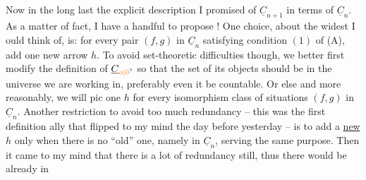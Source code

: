  Now in the long last the explicit description I promised of $\underline{C}_{n+1}$ in terms of $\underline{C}_n$. As a matter of fact, I have a handful to propose ! One choice, about the widest I ould think of, is: for every pair $(f,g)$ in $\underline{C}_n$ satisfying condition $(1)$ of (A), add one  new arrow $h$. To avoid set-theoretic difficulties though, we better  first modify the definition of $\underline{C}_{\unsure{o|0}}$ so that the set of its objects should be in the universe we are working in, preferably even it be countable. Or else and more reasonably, we will pic one $h$ for every isomorphism class of situations $(f,g)$ in $\underline{C}_n$. Another restriction to avoid too much redundancy -- this was the first definition ally that flipped to my mind the day before yesterday -- is to add a \uline{new} $h$ only when there is no ``old'' one, namely in $\underline{C}_n$, serving the same purpose. Then it came to my mind that there is a lot of redundancy still, thus there would be already in


